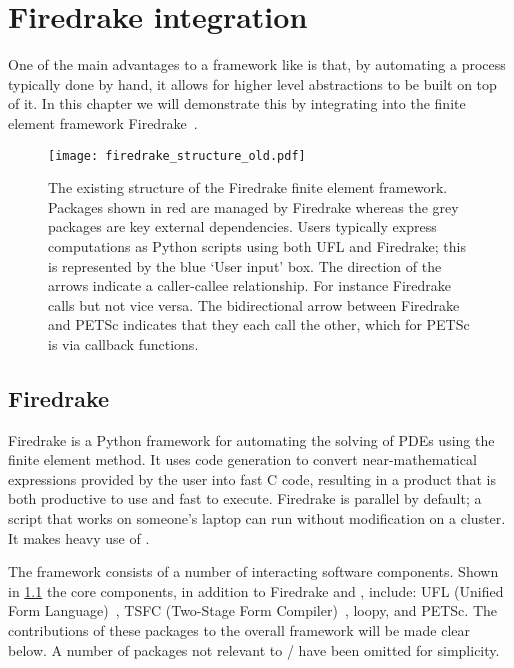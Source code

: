 \documentclass[thesis]{subfiles}
\begin{document}
\chapter{Firedrake integration}
\label{chapter:firedrake}

One of the main advantages to a framework like  is that, by automating a process typically done by hand, it allows for higher level abstractions to be built on top of it.
In this chapter we will demonstrate this by integrating  into the finite element framework Firedrake~\cite{FiredrakeUserManual}.

\begin{figure}
  \texttt{[image: firedrake\_structure\_old.pdf]}
  \caption{
    The existing structure of the Firedrake finite element framework.
    Packages shown in red are managed by Firedrake whereas the grey packages are key external dependencies.
    Users typically express computations as Python scripts using both UFL and Firedrake; this is represented by the blue `User input' box.
    The direction of the arrows indicate a caller-callee relationship.
    For instance Firedrake calls  but not vice versa.
    The bidirectional arrow between Firedrake and PETSc indicates that they each call the other, which for PETSc is via callback functions.
  }
  \label{fig:firedrake_structure_old}
\end{figure}

\section{Firedrake}

Firedrake is a Python framework for automating the solving of PDEs using the finite element method.
It uses code generation to convert near-mathematical expressions provided by the user into fast C code, resulting in a product that is both productive to use and fast to execute.
Firedrake is parallel by default; a script that works on someone's laptop can run without modification on a cluster\footnotemark.
It makes heavy use of .


The framework consists of a number of interacting software components.
Shown in \cref{fig:firedrake_structure_old} the core components, in addition to Firedrake and , include: UFL (Unified Form Language)~\cite{alnaesUnifiedFormLanguage2014a}, TSFC (Two-Stage Form Compiler)~\cite{homolyaTSFCStructurePreservingForm2018}, loopy, and PETSc.
The contributions of these packages to the overall framework will be made clear below.
A number of packages not relevant to / have been omitted for simplicity.
\end{document}
